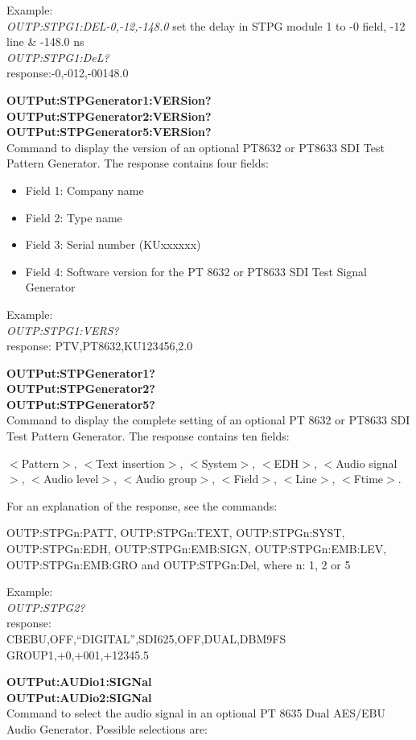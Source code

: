 Example:\\
\textit{OUTP:STPG1:DEL-0,-12,-148.0}
set the delay in STPG module 1 to -0 field, -12 line \& -148.0 ns\\
\textit{OUTP:STPG1:DeL?}\\ 
response:-0,-012,-00148.0

\textbf{OUTPut:STPGenerator1:VERSion?}\\
\textbf{OUTPut:STPGenerator2:VERSion?}\\
\textbf{OUTPut:STPGenerator5:VERSion?}\\
Command to display the version of an optional PT8632 or PT8633 SDI Test Pattern Generator. The response contains four fields:

\begin{itemize}
\item Field 1: Company name
\item Field 2: Type name
\item Field 3: Serial number (KUxxxxxx)
\item Field 4: Software version for the PT 8632 or PT8633 SDI Test Signal Generator
\end{itemize}

Example:\\
\textit{OUTP:STPG1:VERS?}\\
response: PTV,PT8632,KU123456,2.0

\textbf{OUTPut:STPGenerator1?}\\
\textbf{OUTPut:STPGenerator2?}\\
\textbf{OUTPut:STPGenerator5?}\\
Command to display the complete setting of an optional PT 8632 or PT8633 SDI Test Pattern Generator. The response contains ten fields: 

$<$Pattern$>$, $<$Text insertion$>$, $<$System$>$, $<$EDH$>$, $<$Audio signal$>$, $<$Audio level$>$, $<$Audio group$>$, $<$Field$>$, $<$Line$>$, $<$Ftime$>$. 

For an explanation of the response, see the commands: 

OUTP:STPGn:PATT, OUTP:STPGn:TEXT, OUTP:STPGn:SYST, OUTP:STPGn:EDH, OUTP:STPGn:EMB:SIGN, OUTP:STPGn:EMB:LEV, OUTP:STPGn:EMB:GRO and OUTP:STPGn:Del, where n: 1, 2 or 5

Example:\\
\textit{OUTP:STPG2?}\\
response:\\
CBEBU,OFF,``DIGITAL'',SDI625,OFF,DUAL,DBM9FS GROUP1,+0,+001,+12345.5

\textbf{OUTPut:AUDio1:SIGNal}\\
\textbf{OUTPut:AUDio2:SIGNal}\\
Command to select the audio signal in an optional PT 8635 Dual AES/EBU Audio Generator. Possible selections are:

